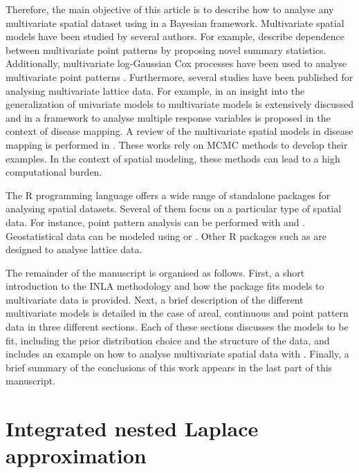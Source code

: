 \medskip
Therefore, the main objective of this article is to describe how to analyse any multivariate spatial dataset using  in a Bayesian framework.
Multivariate spatial models have been studied by several authors. For example, \citet{VanLieshout1999} describe dependence between multivariate point patterns  by proposing novel summary statistics. Additionally, multivariate log-Gaussian Cox processes have been used to analyse multivariate point patterns \citep{DiggleMoraga, WaagerMultLogGau, gomez2015analysis}.
Furthermore, several studies have been published for analysing multivariate lattice data. For example, in \citet{macnab2018} an insight into the generalization of univariate models to multivariate models is extensively discussed and in \citet{martinez2017} a framework to analyse multiple response variables is proposed in the context of disease mapping. A review of the multivariate spatial models in disease mapping is performed in \citet{LibroMigue}. These works rely on MCMC methods to develop their examples. In the context of spatial modeling, these methods can lead to a high computational burden.


\medskip
The R programming \citep{r:2022} language offers a wide range of standalone packages for analysing spatial datasets. Several of them focus on a particular type of spatial data. For instance, point pattern analysis can be performed with  \citep{spatstat:2015} and  \citep{spatialkernel}. Geostatistical data can be modeled using  \citep{gstat, gstatRpackage} or  \citep{spBayes, spBayes2}. Other R packages such as  \citep{CARBayes} are designed to analyse lattice data.


\medskip
The remainder of the manuscript is organised as follows. First, a short introduction to the INLA methodology and how the  package fits models to multivariate data is provided. Next, a brief description of the different multivariate models is detailed in the case of areal, continuous and point pattern data in three different sections. Each of these sections discusses the models to be fit, including the prior distribution choice and the structure of the data, and includes an example on how to analyse multivariate spatial data with . Finally, a brief summary of the conclusions of this work appears in the last part of this manuscript.


\section{Integrated nested Laplace approximation}
\label{sec:INLA}

